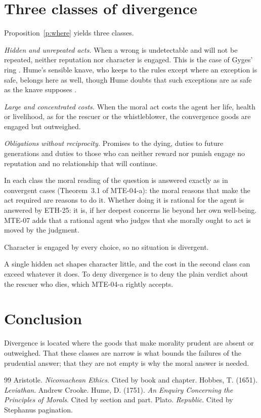 \documentclass{situationist-preprint}
\begin{document}
\section{Three classes of divergence}\label{s:classes}

Proposition~\ref{p:where} yields three classes.

\emph{Hidden and unrepeated acts.} When a wrong is undetectable and will not be repeated, neither reputation nor character is engaged. This is the case of Gyges' ring \citep[359c--360d]{PlatoRepublic}. Hume's sensible knave, who keeps to the rules except where an exception is safe, belongs here as well, though Hume doubts that such exceptions are as safe as the knave supposes \citep[IX.ii]{HumeEnquiryMorals}.

\emph{Large and concentrated costs.} When the moral act costs the agent her life, health or livelihood, as for the rescuer or the whistleblower, the convergence goods are engaged but outweighed.

\emph{Obligations without reciprocity.} Promises to the dying, duties to future generations and duties to those who can neither reward nor punish engage no reputation and no relationship that will continue.

In each class the moral reading of the question is answered exactly as in convergent cases (Theorem~3.1 of MTE-04-a): the moral reasons that make the act required are reasons to do it. Whether doing it is rational for the agent is answered by ETH-25: it is, if her deepest concerns lie beyond her own well-being. MTE-07 adds that a rational agent who judges that she morally ought to act is moved by the judgment.

\begin{objection}
Character is engaged by every choice, so no situation is divergent.
\end{objection}

\begin{reply}
A single hidden act shapes character little, and the cost in the second class can exceed whatever it does. To deny divergence is to deny the plain verdict about the rescuer who dies, which MTE-04-a rightly accepts.
\end{reply}

\section{Conclusion}

Divergence is located where the goods that make morality prudent are absent or outweighed. That these classes are narrow is what bounds the failures of the prudential answer; that they are not empty is why the moral answer is needed.

\begin{thebibliography}{99}\small
{} Aristotle. \emph{Nicomachean Ethics}. Cited by book and chapter.
 Hobbes, T. (1651). \emph{Leviathan}. Andrew Crooke.
 Hume, D. (1751). \emph{An Enquiry Concerning the Principles of Morals}. Cited by section and part.
 Plato. \emph{Republic}. Cited by Stephanus pagination.
\end{thebibliography}
\end{document}
